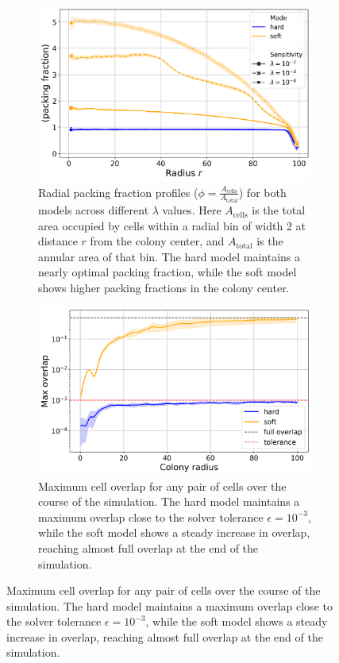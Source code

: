 \documentclass[conference]{IEEEtran}
\begin{document}
\begin{figure}[H]
    \begin{subfigure}[b]{\linewidth}
        \centering
        \includegraphics[width=\linewidth]{figures/comparison_plots/combined_radial_packing_fraction.png}
        \caption{Radial packing fraction profiles ($\phi = \frac{A_{\text{cells}}}{A_{\text{total}}}$) for both models across different $\lambda$ values. Here $A_{\text{cells}}$ is the total area occupied by cells within a radial bin of width 2 at distance $r$ from the colony center, and $A_{\text{total}}$ is the annular area of that bin. The hard model maintains a nearly optimal packing fraction, while the soft model shows higher packing fractions in the colony center.}
        \label{fig:radial_distribution_packing_fraction}
    \end{subfigure}

    \begin{subfigure}[b]{\linewidth}
        \centering
        \includegraphics[width=\linewidth]{figures/comparison_plots/combined_colony_radius_vs_max_overlap_with_lines.png}
        \caption{Maximum cell overlap for any pair of cells over the course of the simulation. The hard model maintains a maximum overlap close to the solver tolerance $\epsilon = 10^{-3}$, while the soft model shows a steady increase in overlap, reaching almost full overlap at the end of the simulation.}
        \label{fig:max_overlap_simulation}
    \end{subfigure}


\end{figure}
\end{document}
